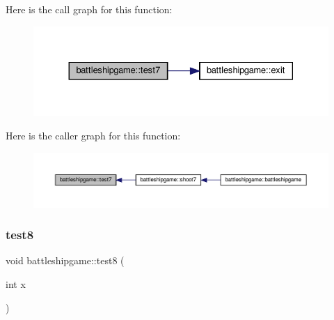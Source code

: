 Here is the call graph for this function\+:
\nopagebreak
\begin{figure}[H]
\begin{center}
\leavevmode
\includegraphics[width=330pt]{classbattleshipgame_a04531484e5ac0cb61328e6a07f6bbe3b_cgraph}
\end{center}
\end{figure}
Here is the caller graph for this function\+:
\nopagebreak
\begin{figure}[H]
\begin{center}
\leavevmode
\includegraphics[width=350pt]{classbattleshipgame_a04531484e5ac0cb61328e6a07f6bbe3b_icgraph}
\end{center}
\end{figure}
\mbox{\label{classbattleshipgame_ad30b973cdaa9a48bea832d28e9c66a23}} 
\subsubsection{\texorpdfstring{test8}{test8}}
{\footnotesize\ttfamily void battleshipgame\+::test8 (\begin{DoxyParamCaption}\item[{int}]{x }\end{DoxyParamCaption})\hspace{0.3cm}{\ttfamily [slot]}}

